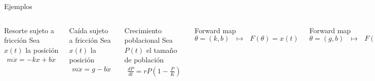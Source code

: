 \documentclass[10pt,aspectratio=169]{beamer}
\begin{document}
\begin{frame}{Ejemplos}
  \begin{columns}[T,onlytextwidth]

    
    \begin{alertblock}{Resorte sujeto a fricción}
      Sea $x(t)$ la posición
      \begin{align*}
        m\ddot{x} = -kx + b \dot{x}
      \end{align*}
    \end{alertblock}
    
    \begin{block}{Caída sujeto a fricción}
      Sea $x(t)$ la posición
      \begin{align*}
        m\ddot{x} = g - b \dot{x}
      \end{align*}
    \end{block}

      \begin{alertblock}{Crecimiento poblacional}
        Sea $P(t)$ el tamaño de población
        \begin{align*}
          \frac{dP}{dt} = r P \left(1 - \frac{P}{K}\right) 
        \end{align*}
      \end{alertblock}



      \begin{alertblock}{Forward map}
        $\theta = (k,b)  \:\:\: \mapsto \:\:\: F(\theta) = x(t)$
      \end{alertblock}
      
      \vspace*{1 cm}
      
      \begin{block}{Forward map}
        $\theta = (g,b)  \:\:\: \mapsto \:\:\: F(\theta) = x(t)$
      \end{block}

      \vspace*{1 cm}

      \begin{alertblock}{Forward map}
        $\theta = (r,K)  \:\:\: \mapsto \:\:\: F(\theta) = P(t)$
      \end{alertblock}

  \end{columns}
\end{frame}
\end{document}
